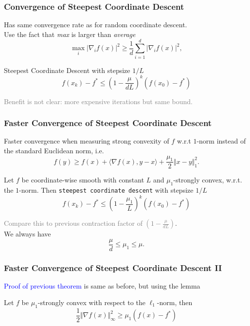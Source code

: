 \documentclass[aspectratio=149]{beamer}
\begin{document}
\begin{frame}
  \frametitle{Convergence of Steepest Coordinate Descent}
  Has same convergence rate as for random coordinate descent.\\
  Use the fact that \emph{max} is larger than \emph{average}
  \begin{equation}
    \max_i \vert \nabla_i f(x) \vert^2 \ge  \frac{1}{d} \sum_{i=1}^{d} \vert \nabla_i f(x) \vert^2,
  \end{equation}
  \begin{corollary}%
    Steepest Coordinate Descent with stepsize $1/L$
  \begin{equation}
      f(x_k)- f^* \le {\left(1 - \frac{\mu}{d L}\right)}^k (f(x_0)-f^*)
  \end{equation}
  \end{corollary}
  \textcolor{gray}{Benefit is not clear: more expensive iterations but same bound.}
\end{frame}


\begin{frame}
  \frametitle{Faster Convergence of Steepest Coordinate Descent}
  Faster convergence when measuring strong convexity of $f$ w.r.t $1$-norm instead of the standard Euclidean norm, i.e.
  \begin{equation}
      f(y) \ge f(x) + \langle \nabla f(x), y-x \rangle + \frac{\mu_1}{2} \Vert x-y \Vert_1^2.
  \end{equation}

  \begin{theorem}
    Let $f$ be coordinate-wise smooth with constant $L$ and $\mu_1$-strongly convex, w.r.t. the $1$-norm.
    Then \colorbox{gray!30}{\textup{\texttt{steepest coordinate descent}}} with stepsize $1/L$
    \begin{equation}
      f(x_k)- f^* \le {\left(1 - \frac{\mu_1}{L}\right)}^k (f(x_0)-f^*)
    \end{equation}
  \end{theorem}
  \textcolor{gray}{Compare this to previous contraction factor of $(1-\frac{\mu}{d L})$}.\\
  We always have
  \begin{equation}
    \frac{\mu}{d} \le \mu_1 \le \mu.
  \end{equation}
\end{frame}


\begin{frame}
  \frametitle{Faster Convergence of Steepest Coordinate Descent II}
  \textcolor{blue}{Proof of previous theorem} is same as before, but using the lemma

  \begin{lemma}%
    Let $f$ be $\mu_1$-strongly convex with respect to the $\ell_1$-norm, then
    \begin{equation}
      \frac12 \Vert \nabla f(x) \Vert^2_\infty \ge \mu_1 (f(x)-f^*)
    \end{equation}

  \end{lemma}
\end{frame}
\end{document}

